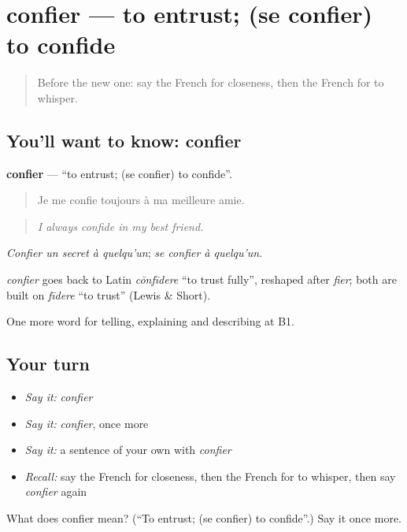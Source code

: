 \section[confier]{confier — to entrust; (se confier) to confide}

\label{lesson:FR-C488-confier}



\begin{quote}
Before the new one: say the French for closeness, then the French for to whisper.
\end{quote}

\subsection*{You'll want to know: confier}
\textbf{confier} — \textquotedblleft{}to entrust; (se confier) to confide\textquotedblright{}.

\begin{quote}
Je me confie toujours à ma meilleure amie.
\end{quote}

\begin{quote}
\emph{I always confide in my best friend.}
\end{quote}

\emph{Confier un secret à quelqu'un}; \emph{se confier à quelqu'un}.

\begin{cousinweb}
\emph{confier} goes back to Latin \emph{cōnfīdere} \textquotedblleft{}to trust fully\textquotedblright{}, reshaped after \emph{fier}; both are built on \emph{fīdere} \textquotedblleft{}to trust\textquotedblright{} (Lewis \& Short).
\end{cousinweb}

\begin{grammarlens}[title={What you've built}]
One more word for telling, explaining and describing at B1.
\end{grammarlens}

\subsection*{Your turn}
\begin{itemize}
\raggedright
  \item \emph{Say it:} \emph{confier}
  \item \emph{Say it:} \emph{confier}, once more
  \item \emph{Say it:} a sentence of your own with \emph{confier}
  \item \emph{Recall:} say the French for closeness, then the French for to whisper, then say \emph{confier} again
\end{itemize}

\begin{tcolorbox}[breakable,colback=teal!4,colframe=teal!35!black,title={Before you move on}]
What does confier mean? (\textquotedblleft{}To entrust; (se confier) to confide\textquotedblright{}.) Say it once more.
\end{tcolorbox}
